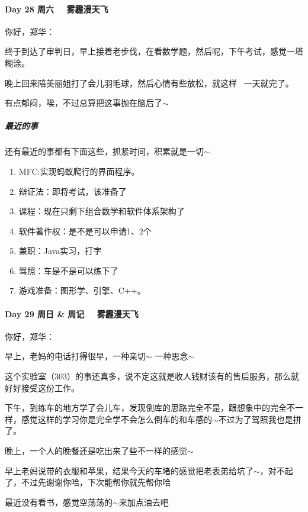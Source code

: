 \documentclass[UTF8,a4paper,8pt]{ctexart}
\begin{document}
 	\paragraph{Day 28  周六 \  \ 雾霾漫天飞} 
 	    你好，郑华：
 	    
 	    终于到达了审判日，早上接着老步伐，在看数学题，然后呢，下午考试，感觉一塔糊涂。
 	    
 	    晚上回来陪美丽姐打了会儿羽毛球，然后心情有些放松，就这样~ 一天就完了。
 	    
 	    有点郁闷，唉，不过总算把这事抛在脑后了$\sim$
 	    
 	    \subparagraph{最近的事}还有最近的事都有下面这些，抓紧时间，积累就是一切$\sim$
 	    	\begin{enumerate}[fullwidth,itemindent=2em,label=(\arabic*)]
 	    		\item  MFC:实现蚂蚁爬行的界面程序。
 	    		\item  辩证法：即将考试，该准备了
 	    		\item  课程：现在只剩下组合数学和软件体系架构了
 	    		\item  软件著作权：是不是可以申请1、2个
 	    		\item  兼职：Java实习，打字
 	    		\item  驾照：车是不是可以练下了
 	    		\item  游戏准备：图形学、引擎、C++。
 		    \end{enumerate} 	
 		    
     \paragraph{Day 29  周日 \& 周记 \  \ 雾霾漫天飞} 
          你好，郑华：
          
          早上，老妈的电话打得很早，一种亲切$\sim$ 一种思念$\sim$
          
          这个实验室（303）的事还真多，说不定这就是收人钱财该有的售后服务，那么就好好接受这份工作。
          
          下午，到练车的地方学了会儿车，发现倒库的思路完全不是，跟想象中的完全不一样，感觉这样的学习你是完全学不会怎么倒车的和车感的$\sim$不过为了驾照我也是拼了。
          
          晚上，一个人的晚餐还是吃出来了些不一样的感觉$\sim$
          
          早上老妈说带的衣服和苹果，结果今天的车堵的感觉把老表弟给坑了$\sim$，对不起了，不过先谢谢你哈，下次能帮你就先帮你哈
          
          最近没有看书，感觉空荡荡的$\sim$来加点油去吧
          
\end{document}
